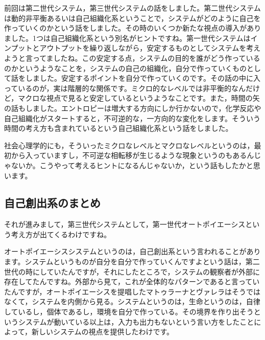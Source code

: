 \documentclass{ltjsbook}
\begin{document}
前回は第二世代システム，第三世代システムの話をしました。第二世代システムは動的非平衡あるいは自己組織化系ということで，システムがどのように自己を作っていくのかという話をしました。その時のいくつか新たな視点の導入がありました。1つは自己組織化系という別名がヒントですね。第一世代システムはインプットとアウトプットを繰り返しながら，安定するものとしてシステムを考えようと言ってましたね。この安定する点，システムの目的を誰がどう作っているのかというようなことを，システムの自己の組織化，自分で作っていくものとして話をしました。安定するポイントを自分で作っていくのです。その話の中に入っているのが，実は階層的な関係です。ミクロ的なレベルでは非平衡的なんだけど，マクロな視点で見ると安定しているというようなことです。また，時間の矢の話もしました。エントロピーは増大する方向にしか行かないので，化学反応や自己組織化がスタートすると，不可逆的な，一方向的な変化をします。そういう時間の考え方も含まれているという自己組織化系という話をしました。

社会心理学的にも，そういったミクロなレベルとマクロなレベルというのは，最初から入っていますし，不可逆な相転移が生じるような現象というのもあるんじゃないか。こうやって考えるヒントになるんじゃないか，という話もしたかと思います。

\subsection{自己創出系のまとめ}

それが進みまして，第三世代システムとして，第一世代オートポイエーシスという考え方が出てくるわけですね。

オートポイエーシスシステムというのは，自己創出系という言われることがあります。システムというものが自分を自分で作っていくんですよという話は，第二世代の時にしていたんですが，それにしたところで，システムの観察者が外部に存在してたんですね。外部から見て，これが全体的なパターンであると言っていたんですが，オートポイエーシスを提唱したマトゥラーナとヴァレラはそうではなくて，システムを内側から見る。システムというのは，生命というのは，自律しているし，個体であるし，環境を自分で作っている。その境界を作り出そうというシステムが動いている以上は，入力も出力もないという言い方をしたことによって，新しいシステムの視点を提供したわけです。
\end{document}
